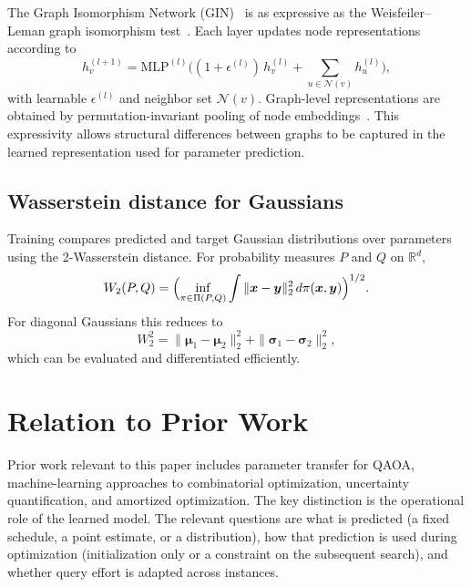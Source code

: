 \documentclass[aps,prx,reprint,superscriptaddress,longbibliography]{revtex4-2}
\newcommand{\QAOA}{\textnormal{\textsc{QAOA}}}
\newcommand{\GIN}{\textnormal{\textsc{GIN}}}
\newcommand{\calN}{\mathcal{N}}
\newcommand{\bbR}{\mathbb{R}}
\begin{document}
The Graph Isomorphism Network (\GIN)~\cite{xu2019} is as expressive as
the Weisfeiler--Leman graph isomorphism test~\cite{weisfeiler1968}.
Each layer updates node representations according to
\begin{equation}
    h_v^{(l+1)} = \mathrm{MLP}^{(l)}\!\bigl(
    (1+\epsilon^{(l)})\, h_v^{(l)}
    + {\textstyle\sum_{u \in \calN(v)}} h_u^{(l)}
    \bigr),
    \label{eq:gin_update}
\end{equation}
with learnable $\epsilon^{(l)}$ and neighbor set $\calN(v)$.
Graph-level representations are obtained by permutation-invariant
pooling of node embeddings~\cite{hamilton2017,gilmer2017}.
This expressivity allows structural differences between graphs to be
captured in the learned representation used for parameter prediction.

\subsection{Wasserstein distance for Gaussians}
\label{sec:wasserstein_bg}

Training compares predicted and target Gaussian distributions over
parameters using the 2-Wasserstein distance. For probability measures
$P$ and $Q$ on $\bbR^d$,
\begin{equation}
    W_2(P,Q) = \Bigl(\inf_{\pi \in \Pi(P,Q)}
    \int \|\bm{x} - \bm{y}\|_2^2\, d\pi(\bm{x},\bm{y})\Bigr)^{1/2}.
    \label{eq:w2_def}
\end{equation}
For diagonal Gaussians this reduces to
\begin{equation}
    W_2^2 = \|\bm\mu_1 - \bm\mu_2\|_2^2
    + \|\bm\sigma_1 - \bm\sigma_2\|_2^2,
\end{equation}
which can be evaluated and differentiated efficiently.


\section{Relation to Prior Work}
\label{sec:related}

Prior work relevant to this paper includes parameter transfer for
\QAOA{}, machine-learning approaches to combinatorial optimization,
uncertainty quantification, and amortized optimization. The key
distinction is the operational role of the learned model. The relevant
questions are what is predicted (a fixed schedule, a point estimate, or
a distribution), how that prediction is used during optimization
(initialization only or a constraint on the subsequent search), and
whether query effort is adapted across instances.
\end{document}
